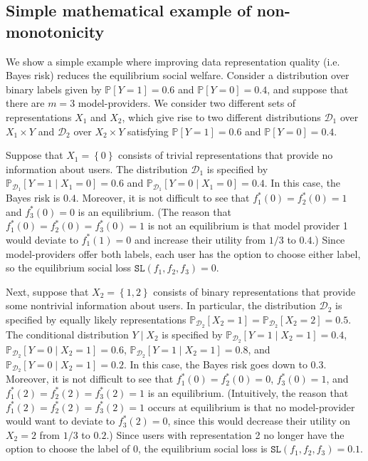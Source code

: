 \documentclass[letterpaper,11pt]{article}
\theoremstyle{plain}
\begin{document}
\subsection{Simple mathematical example of non-monotonicity}\label{subsec:example}

We show a simple example where improving data representation quality (i.e. Bayes risk) reduces the equilibrium social welfare. Consider a distribution over binary labels given by $\mathbb{P}[Y = 1] = 0.6$ and $\mathbb{P}[Y = 0] = 0.4$, and suppose that there are $m = 3$ model-providers. We consider two different sets of representations $X_1$ and $X_2$, which give rise to two different distributions $\mathcal{D}_1$ over $X_1 \times Y$ and $\mathcal{D}_2$ over $X_2 \times Y$ satisfying  $\mathbb{P}[Y = 1] = 0.6$ and $\mathbb{P}[Y = 0] = 0.4$. 

Suppose that $X_1 = \left\{0\right\}$ consists of trivial representations that provide no information about users. The distribution $\mathcal{D}_1$ is specified by $\mathbb{P}_{\mathcal{D}_1}[Y = 1 \mid X_1 = 0] = 0.6$ and $\mathbb{P}_{\mathcal{D}_1}[Y = 0 \mid X_1 = 0] = 0.4$. In this case, the Bayes risk is $0.4$. Moreover,  
it is not difficult to see that $f^*_1(0) = f^*_2(0) = 1$ and $f^*_3(0) = 0$ is an equilibrium. (The reason that $f^*_1(0) = f^*_2(0) = f^*_3(0) = 1$ is not an equilibrium is that model provider 1 would deviate to $f^*_1(1) = 0$ and 
increase their utility from $1/3$ to $0.4$.) Since model-providers offer both labels, each user has the option to choose either label, so the equilibrium social loss $\texttt{SL}(f_1, f_2, f_3) = 0$. 

Next, suppose that $X_2 = \left\{1,2\right\}$ consists of binary representations that provide some nontrivial information about users.
In particular, the distribution $\mathcal{D}_2$ is specified by equally likely representations $\mathbb{P}_{\mathcal{D}_2}[X_2 = 1] = \mathbb{P}_{\mathcal{D}_2}[X_2 = 2] = 0.5$. The conditional distribution $Y \mid X_2$ is specified by $\mathbb{P}_{\mathcal{D}_2}[Y = 1 \mid X_2 = 1] = 0.4$, $\mathbb{P}_{\mathcal{D}_2}[Y = 0 \mid X_2 = 1] = 0.6$, $\mathbb{P}_{\mathcal{D}_2}[Y = 1 \mid X_2 = 1] = 0.8$, and $\mathbb{P}_{\mathcal{D}_2}[Y = 0 \mid X_2 = 1] = 0.2$. In this case, the Bayes risk goes down to $0.3$. Moreover, it is not difficult to see that $f^*_1(0) = f^*_2(0) = 0$,  $f^*_3(0) = 1$, and $f^*_1(2) = f^*_2(2) = f^*_3(2) = 1$ is an equilibrium. (Intuitively, the reason that $f^*_1(2) = f^*_2(2) = f^*_3(2) = 1$ occurs at equilibrium is that no model-provider would want to deviate to $f^*_3(2) = 0$, since this would decrease their utility on $X_2 = 2$ from $1/3$ to $0.2$.) Since users with representation 2 no longer have the option to choose the label of $0$, the equilibrium social loss is $\texttt{SL}(f_1, f_2, f_3) = 0.1$.
\end{document}
